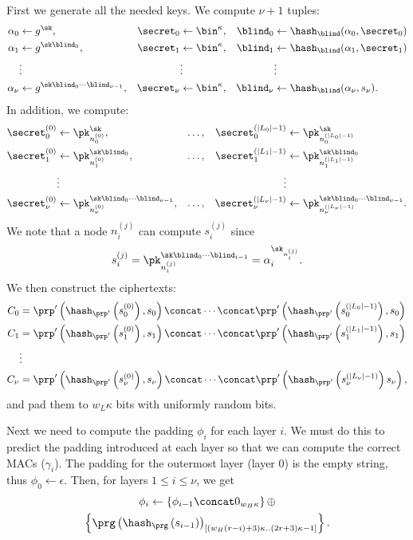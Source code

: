 First we generate all the needed keys.
We compute \(\nu+1\) tuples:
\begin{align*}
  \alpha_0 &\gets g^\sk,
  & \secret_0 &\gets \bin^\kappa,
  & \blind_0 &\gets \hash_\blind(\alpha_0, \secret_0) \\
  \alpha_1 &\gets g^{\sk\blind_0},
  & \secret_1 &\gets \bin^\kappa,
  & \blind_1 &\gets \hash_\blind(\alpha_1, \secret_1) \\
  &\vdots &&\vdots && \vdots \\
  \alpha_\nu &\gets g^{\sk \blind_0\dotsb \blind_{\nu-1}},
  & \secret_\nu &\gets \bin^\kappa,
  & \blind_\nu &\gets \hash_\blind(\alpha_\nu, s_\nu).
\end{align*}
In addition, we compute:
\begin{align*}
  \secret_0^{(0)} &\gets \pk_{n_0^{(0)}}^\sk,
  & \dotsc, &
  & \secret_0^{(|L_0|-1)} &\gets \pk_{n_0^{(|L_0|-1)}}^\sk \\
  \secret_1^{(0)} &\gets \pk_{n_1^{(0)}}^{\sk \blind_0},
  & \dotsc, &
  & \secret_1^{(|L_1|-1)} &\gets \pk_{n_1^{(|L_1|-1)}}^{\sk \blind_0} \\
  & \vdots &&& \vdots \\
  \secret_\nu^{(0)} &\gets \pk_{n_\nu^{(0)}}^{\sk \blind_0\dotsb 
    \blind_{\nu-1}},
  & \dotsc, &
  & \secret_\nu^{(|L_\nu|-1)} &\gets \pk_{n_\nu^{(|L_\nu|-1)}}^{\sk 
    \blind_0\dotsb \blind_{\nu-1}}.
\end{align*}
We note that a node \(n_i^{(j)}\) can compute \(s_i^{(j)}\) since \[
  s_i^{(j)} = \pk_{n_i^{(j)}}^{\sk \blind_0\dotsb \blind_{i-1}} = 
  \alpha_i^{\sk_{n_i^{(j)}}}.
\]
We then construct the ciphertexts:
\begin{align*}
  C_0 &= \prp'\left(\hash_{\prp'}\left(s_0^{(0)}\right), s_0\right)
  \concat \dotsb
  \concat \prp'\left(\hash_{\prp'}\left(s_0^{(|L_0|-1)}\right), s_0\right) \\
  C_1 &= \prp'\left(\hash_{\prp'}\left(s_1^{(0)}\right), s_1\right)
  \concat \dotsb
  \concat \prp'\left(\hash_{\prp'}\left(s_1^{(|L_1|-1)}\right), s_1\right) \\
  & \vdots \\
  C_\nu &= \prp'\left(\hash_{\prp'}\left(s_\nu^{(0)}\right), s_\nu\right)
  \concat \dotsb
  \concat \prp'\left(\hash_{\prp'}\left(s_\nu^{(|L_\nu|-1)}\right) 
    s_\nu\right),
\end{align*}
and pad them to \(w_L\kappa\) bits with uniformly random bits.

Next we need to compute the padding \(\phi_i\) for each layer \(i\).
We must do this to predict the padding introduced at each layer so that we 
can compute the correct \acp{MAC} (\(\gamma_i\)).
The padding for the outermost layer (layer 0) is the empty string, thus \(\phi_0 
  \gets \epsilon\).
Then, for layers \(1\leq i\leq \nu\), we get
\begin{multline*}
  \phi_i\gets \left\{\phi_{i-1}\concat 0_{w_H\kappa}\right\}\oplus \\
  \left\{\prg\left(\hash_\prg\left(s_{i-1}\right)\right)_{[(w_H(r-i)+3)\kappa..(2r+3)\kappa-1]}\right\}.
\end{multline*}

